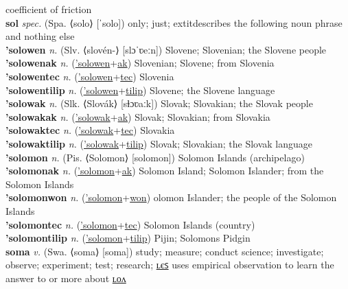 coefficient of friction \label{sapupowinyolyan} \\
\textbf{sol} \textit{spec.} (Spa. ⟨solo⟩ [ˈsolo])
only; just; 	extit{describes the following noun phrase and nothing else} \label{sol} \\
\textbf{'solowen} \textit{n.} (Slv. ⟨slovén-⟩ [slɔˈʋeːn])
Slovene; Slovenian; the Slovene people \label{'solowen} \\
\textbf{'solowenak} \textit{n.} (\hyperref['solowen]{'solowen}+\hyperref[ak]{ak})
Slovenian; Slovene; from Slovenia \label{'solowenak} \\
\textbf{'solowentec} \textit{n.} (\hyperref['solowen]{'solowen}+\hyperref[tec]{tec})
Slovenia \label{'solowentec} \\
\textbf{'solowentilip} \textit{n.} (\hyperref['solowen]{'solowen}+\hyperref[tilip]{tilip})
Slovene; the Slovene language \label{'solowentilip} \\
\textbf{'solowak} \textit{n.} (Slk. ⟨Slovák⟩ [sɫɔʋaːk])
Slovak; Slovakian; the Slovak people \label{'solowak} \\
\textbf{'solowakak} \textit{n.} (\hyperref['solowak]{'solowak}+\hyperref[ak]{ak})
Slovak; Slovakian; from Slovakia \label{'solowakak} \\
\textbf{'solowaktec} \textit{n.} (\hyperref['solowak]{'solowak}+\hyperref[tec]{tec})
Slovakia \label{'solowaktec} \\
\textbf{'solowaktilip} \textit{n.} (\hyperref['solowak]{'solowak}+\hyperref[tilip]{tilip})
Slovak; Slovakian; the Slovak language \label{'solowaktilip} \\
\textbf{'solomon} \textit{n.} (Pis. ⟨Solomon⟩ [solomon])
Solomon Islands (archipelago) \label{'solomon} \\
\textbf{'solomonak} \textit{n.} (\hyperref['solomon]{'solomon}+\hyperref[ak]{ak})
Solomon Island; Solomon Islander; from the Solomon Islands \label{'solomonak} \\
\textbf{'solomonwon} \textit{n.} (\hyperref['solomon]{'solomon}+\hyperref[won]{won})
olomon Islander; the people of the Solomon Islands \label{'solomonwon} \\
\textbf{'solomontec} \textit{n.} (\hyperref['solomon]{'solomon}+\hyperref[tec]{tec})
Solomon Islands (country) \label{'solomontec} \\
\textbf{'solomontilip} \textit{n.} (\hyperref['solomon]{'solomon}+\hyperref[tilip]{tilip})
Pijin; Solomons Pidgin \label{'solomontilip} \\
\textbf{soma} \textit{v.} (Swa. ⟨soma⟩ [soma])
study; measure; conduct science; investigate; observe; experiment; test; research; \hyperref[somales]{ʟєꜱ} uses empirical observation to learn the answer to or more about \hyperref[somalon]{ʟᴏᴧ} \label{soma} \\
